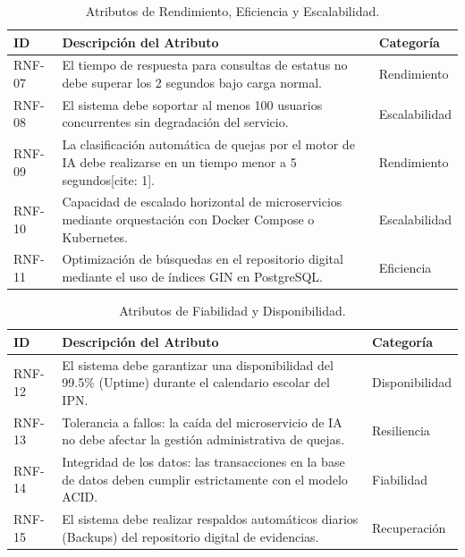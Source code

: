 \begin{table}[h!]
\centering
\scriptsize
\caption{Atributos de Rendimiento, Eficiencia y Escalabilidad.}
\label{tab:rnf_rendimiento}
\begin{tabular}{@{} l p{9.5cm} l @{}}
\toprule
\rowcolor[HTML]{2D3E50} 
\textbf{\color[HTML]{FFFFFF} ID} & \textbf{\color[HTML]{FFFFFF} Descripción del Atributo} & \textbf{\color[HTML]{FFFFFF} Categoría} \\ \midrule
RNF-07 & El tiempo de respuesta para consultas de estatus no debe superar los 2 segundos bajo carga normal. & Rendimiento \\
\rowcolor[HTML]{F2F4F7} 
RNF-08 & El sistema debe soportar al menos 100 usuarios concurrentes sin degradación del servicio. & Escalabilidad \\
RNF-09 & La clasificación automática de quejas por el motor de IA debe realizarse en un tiempo menor a 5 segundos[cite: 1]. & Rendimiento \\
\rowcolor[HTML]{F2F4F7} 
RNF-10 & Capacidad de escalado horizontal de microservicios mediante orquestación con Docker Compose o Kubernetes. & Escalabilidad \\
RNF-11 & Optimización de búsquedas en el repositorio digital mediante el uso de índices GIN en PostgreSQL. & Eficiencia \\ \bottomrule
\end{tabular}
\end{table}

\begin{table}[h!]
\centering
\scriptsize
\caption{Atributos de Fiabilidad y Disponibilidad.}
\label{tab:rnf_fiabilidad}
\begin{tabular}{@{} l p{9.5cm} l @{}}
\toprule
\rowcolor[HTML]{2D3E50} 
\textbf{\color[HTML]{FFFFFF} ID} & \textbf{\color[HTML]{FFFFFF} Descripción del Atributo} & \textbf{\color[HTML]{FFFFFF} Categoría} \\ \midrule
RNF-12 & El sistema debe garantizar una disponibilidad del 99.5\% (Uptime) durante el calendario escolar del IPN. & Disponibilidad \\
\rowcolor[HTML]{F2F4F7} 
RNF-13 & Tolerancia a fallos: la caída del microservicio de IA no debe afectar la gestión administrativa de quejas. & Resiliencia \\
RNF-14 & Integridad de los datos: las transacciones en la base de datos deben cumplir estrictamente con el modelo ACID. & Fiabilidad \\
\rowcolor[HTML]{F2F4F7} 
RNF-15 & El sistema debe realizar respaldos automáticos diarios (Backups) del repositorio digital de evidencias. & Recuperación \\ \bottomrule
\end{tabular}
\end{table}

